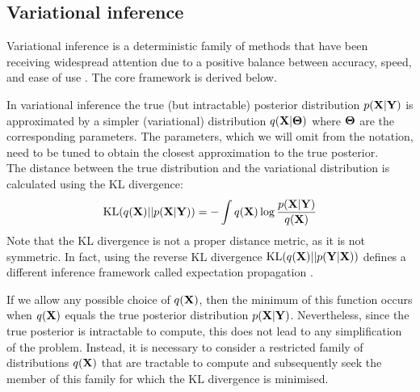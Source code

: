 \subsection{Variational inference}  \label{section:variational_inference}

Variational inference is a deterministic family of methods that have been receiving widespread attention due to a positive balance between accuracy, speed, and ease of use \cite{Blei2016, Zhang2017}. The core framework is derived below.

In variational inference the true (but intractable) posterior distribution $p({\bf X}|{\bf Y})$ is approximated by a simpler (variational) distribution $q({\bf X}|\mbox{\boldmath $\Theta$})$ where $\mbox{\boldmath $\Theta$}$ are the corresponding parameters. The parameters, which we will omit from the notation, need to be tuned to obtain the closest approximation to the true posterior.\\
The distance between the true distribution and the variational distribution is calculated using the KL divergence:
\[
{\rm KL}(q({\bf X})||p({\bf X}|{\bf Y})) = - \int q({\bf X}) \log \frac{p({\bf X}|{\bf Y})}{q({\bf X})}
\]
Note that the KL divergence is not a proper distance metric, as it is not symmetric. In fact, using the reverse KL divergence ${\rm KL}(q({\bf X})||p({\bf Y}|{\bf X}))$ defines a different inference framework called expectation propagation \cite{Minka2001}.

If we allow any possible choice of $q({\bf X})$, then the minimum of this function occurs when $q({\bf X})$ equals the true posterior distribution $p({\bf X}|{\bf Y})$. Nevertheless, since the true posterior is intractable to compute, this does not lead to any simplification of the problem. Instead, it is necessary to consider a restricted family of distributions $q({\bf X})$ that are tractable to compute and subsequently seek the member of this family for which the KL divergence is minimised.

